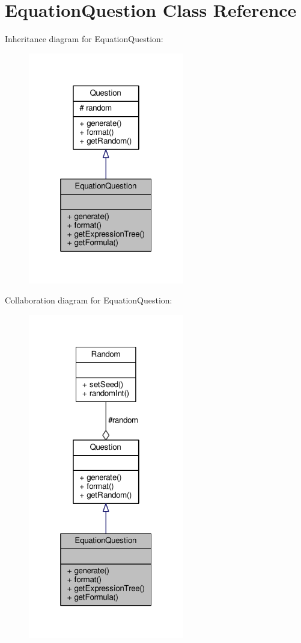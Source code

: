 \hypertarget{classEquationQuestion}{}\section{Equation\+Question Class Reference}
\label{classEquationQuestion}


Inheritance diagram for Equation\+Question\+:
\nopagebreak
\begin{figure}[H]
\begin{center}
\leavevmode
\includegraphics[width=193pt]{classEquationQuestion__inherit__graph}
\end{center}
\end{figure}


Collaboration diagram for Equation\+Question\+:
\nopagebreak
\begin{figure}[H]
\begin{center}
\leavevmode
\includegraphics[width=193pt]{classEquationQuestion__coll__graph}
\end{center}
\end{figure}
